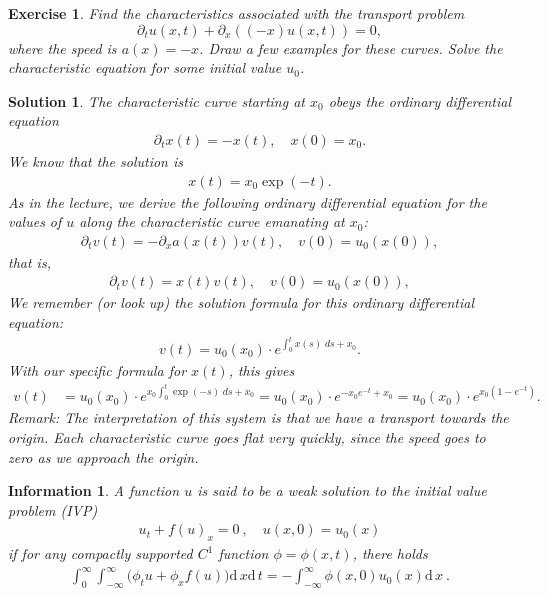 \documentclass[10pt,letterpaper]{article}
\newcommand{\dif}[1][]{\mathrm{d} {#1}\,}
\theoremstyle{break}
\newtheorem{exercise}{Exercise}
\newtheorem*{information}{Information}
\newtheorem{mysolution}{Solution}
\newtheorem*{mysolutioninformation}{Solution Information}
\newenvironment{solution}{\begin{mysolution}}{\end{mysolution}} \newenvironment{solutioninformation}{\begin{mysolutioninformation}}{\end{mysolutioninformation}}
\begin{document}
\begin{exercise}
    Find the characteristics associated with the transport problem 
    $$
        \partial_t u(x,t) + \partial_x\left( (-x) u(x,t) \right) = 0,
    $$
    where the speed is $a(x) = -x$.
    Draw a few examples for these curves. 
    Solve the characteristic equation for some initial value $u_0$.
\end{exercise}
\begin{solution}
    The characteristic curve starting at $x_0$ obeys the ordinary differential equation 
    \begin{align*}
        \partial_t x(t) = - x(t), \quad x(0) = x_0.
    \end{align*}
    We know that the solution is 
    \begin{align*}
        x(t) = x_0 \exp(-t).
    \end{align*}
    As in the lecture, we derive the following ordinary differential equation 
    for the values of $u$ along the characteristic curve emanating at $x_0$: 
    \begin{align*}
        \partial_t v(t) = - \partial_x a( x(t) ) v(t), \quad v(0) = u_0( x(0) ), 
    \end{align*}
    that is, 
    \begin{align*}
        \partial_t v(t) = x(t) v(t), \quad v(0) = u_0( x(0) ), 
    \end{align*}
    We remember (or look up) the solution formula for this ordinary differential equation:
    \begin{align*}
        v(t) = u_0(x_0) \cdot e^{\int_0^t x(s) \;ds + x_0}.
    \end{align*}
    With our specific formula for $x(t)$, this gives 
    \begin{align*}
        v(t) 
        &
        = 
        u_0(x_0) \cdot e^{x_0 \int_0^t \exp(-s) \;ds + x_0}
        = 
        u_0(x_0) \cdot e^{ - x_0 e^{-t} + x_0}
        = 
        u_0(x_0) \cdot e^{ x_0 ( 1 - e^{-t} ) }
        .
    \end{align*}
    \textit{Remark: 
    The interpretation of this system is that we have a transport towards the origin.
    Each characteristic curve goes flat very quickly,
    since the speed goes to zero as we approach the origin. 
    }
\end{solution}





\begin{information}
	A function $u$ is said to be a \emph{weak solution} to the initial value problem (IVP)
	\begin{gather} \label{conLaw}
		u_t+f(u)_x=0\ ,
		\quad
		u(x,0)=u_0(x)
	\end{gather}%
	if for any compactly supported $C^1$ function $\phi=\phi(x,t)$, there holds
	\begin{gather}%
		\int_0^\infty \int_{-\infty}^\infty \Big( \phi_t u +\phi_x f(u)\Big)\dif x\dif t
		=
		-\int_{-\infty}^\infty \phi(x,0)u_0(x)\dif x\ .
	\end{gather}%
\end{information}
\end{document}
